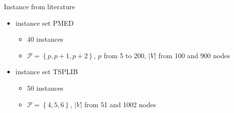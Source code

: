 \documentclass[utf8,aspectratio=1610,ngerman,english]{beamer}
\renewcommand{\emph}[1]{\textcolor{jkuGreen}{#1}}
\def\Cplusplus{C\raisebox{0.5ex}{\tiny\textbf{++}}}
\newcommand{\nPCY}{\hyperref[eq:nPCY]{\texttt{(nPC2)}}\xspace}
\newcommand{\pCP}{($p$CP)\xspace}
\begin{document}

\begin{frame}{Instance from literature}
    \vspace*{-2pt}
    \begin{itemize}
        \setlength\itemsep{1em}
        \item instance set \emph{PMED} \citet{Beasley1985} %
              \begin{itemize}
                  \item 40 instances
                  \item $\mathcal P = \left \{p, p+1, p+2\right \}$, $p$ from 5 to 200, $\left|V\right|$ from 100 and 900 nodes
              \end{itemize} \pause
        \item instance set \emph{TSPLIB} \citet{Reinelt1991} %
              \begin{itemize}
                  \item 50 instances
                  \item $\mathcal P = \left \{4, 5, 6\right \}$, $\left|V\right|$ from 51 and 1002 nodes
              \end{itemize}\pause
    \end{itemize}
\end{frame}
\end{document}
